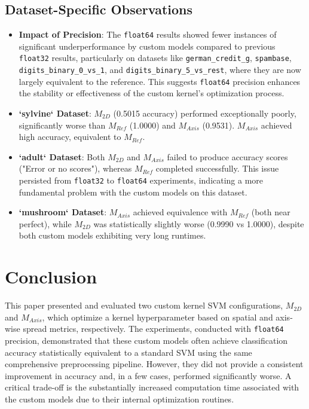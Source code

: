 \documentclass[conference]{IEEEtran} %
\begin{document}
\subsection{Dataset-Specific Observations}
\begin{itemize}
    \item \textbf{Impact of Precision}: The \texttt{float64} results showed fewer instances of significant underperformance by custom models compared to previous \texttt{float32} results, particularly on datasets like \texttt{german\_credit\_g}, \texttt{spambase}, \texttt{digits\_binary\_0\_vs\_1}, and \texttt{digits\_binary\_5\_vs\_rest}, where they are now largely equivalent to the reference. This suggests \texttt{float64} precision enhances the stability or effectiveness of the custom kernel's optimization process.
    \item \textbf{`sylvine` Dataset}: $M_{2D}$ (0.5015 accuracy) performed exceptionally poorly, significantly worse than $M_{Ref}$ (1.0000) and $M_{Axis}$ (0.9531). $M_{Axis}$ achieved high accuracy, equivalent to $M_{Ref}$.
    \item \textbf{`adult` Dataset}: Both $M_{2D}$ and $M_{Axis}$ failed to produce accuracy scores ("Error or no scores"), whereas $M_{Ref}$ completed successfully. This issue persisted from   \texttt{float32} to \texttt{float64} experiments, indicating a more fundamental problem with the custom models on this dataset.
    \item \textbf{`mushroom` Dataset}: $M_{Axis}$ achieved equivalence with $M_{Ref}$ (both near perfect), while $M_{2D}$ was statistically slightly worse (0.9990 vs 1.0000), despite both custom models exhibiting very long runtimes.
\end{itemize}

\section{Conclusion}
This paper presented and evaluated two custom kernel SVM configurations, $M_{2D}$ and $M_{Axis}$, which optimize a kernel hyperparameter based on spatial and axis-wise spread metrics, respectively. The experiments, conducted with \texttt{float64} precision, demonstrated that these custom models often achieve classification accuracy statistically equivalent to a standard SVM using the same comprehensive preprocessing pipeline. However, they did not provide a consistent improvement in accuracy and, in a few cases, performed significantly worse. A critical trade-off is the substantially increased computation time associated with the custom models due to their internal optimization routines.
\end{document}
